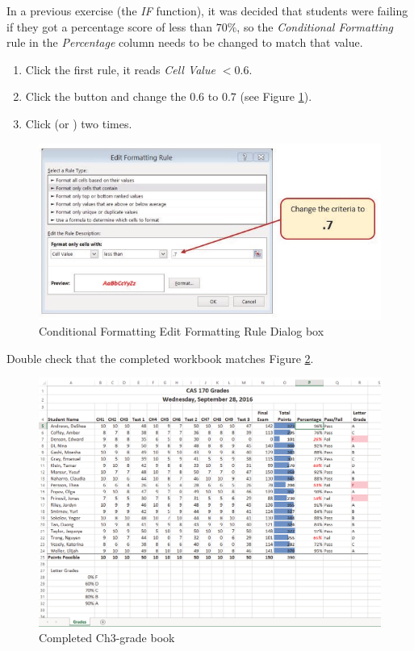 In a previous exercise (the \textit{IF} function), it was decided that students were failing if they got a percentage score of less than $ 70\% $, so the \textit{Conditional Formatting} rule in the \textit{Percentage} column needs to be changed to match that value.

\begin{enumerate}[resume]
	\item Click the first rule, it reads \textit{Cell Value $ <0.6 $}.
	\item Click the  button and change the $ 0.6 $ to $ 0.7 $ (see Figure \ref{03:fig24}).
	\item Click  (or ) two times.
\end{enumerate}

\begin{figure}[H]
	\centering
	\includegraphics[width=\maxwidth{.95\linewidth}]{gfx/ch03_fig24}
	\caption{Conditional Formatting Edit Formatting Rule Dialog box}
	\label{03:fig24}
\end{figure}

Double check that the completed workbook matches Figure \ref{03:fig25}.

\begin{figure}[H]
	\centering
	\includegraphics[width=\maxwidth{.95\linewidth}]{gfx/ch03_fig25}
	\caption{Completed Ch3-grade book}
	\label{03:fig25}
\end{figure}

